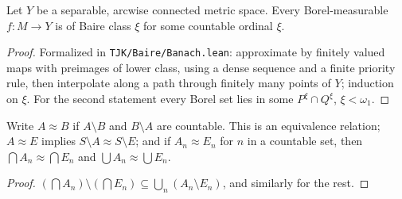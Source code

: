 \begin{theorem}\label{fact:borel-baire}
Let $Y$ be a separable, arcwise connected metric space. Every Borel-measurable $f:M\to Y$ is of Baire
class $\xi$ for some countable ordinal $\xi$.
\end{theorem}
\begin{proof}Formalized in \texttt{TJK/Baire/Banach.lean}: approximate by finitely valued maps with preimages of lower class, using a dense sequence and a finite priority rule, then interpolate along a path through finitely many points of $Y$; induction on $\xi$. For the second statement every Borel set lies in some $P^\xi\cap Q^\xi$, $\xi<\omega_1$.\end{proof}

\begin{lemma}\label{lem:equiv}
Write $A\approx B$ if $A\setminus B$ and $B\setminus A$ are countable. This is an equivalence relation;
$A\approx E$ implies $S\setminus A\approx S\setminus E$; and if $A_n\approx E_n$ for $n$ in a countable
set, then $\bigcap A_n\approx\bigcap E_n$ and $\bigcup A_n\approx\bigcup E_n$.
\end{lemma}
\begin{proof}
$(\bigcap A_n)\setminus(\bigcap E_n)\subseteq\bigcup_n(A_n\setminus E_n)$, and similarly for the rest.
\end{proof}

